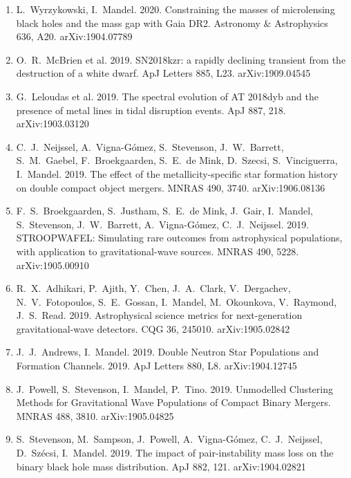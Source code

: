 \documentclass[margin,line]{res}
\begin{document}
\begin{resume}
\begin{enumerate}
\item L.~Wyrzykowski, I.~Mandel.  2020.  Constraining the masses of microlensing black holes and the mass gap with Gaia DR2.  Astronomy \& Astrophysics 636, A20.  arXiv:1904.07789

\item O.~R.~McBrien et al. 2019. SN2018kzr: a rapidly declining transient from the destruction of a white dwarf. ApJ Letters 885, L23.  arXiv:1909.04545

\item G.~Leloudas et al.  2019. The spectral evolution of AT 2018dyb and the presence of metal lines in tidal disruption events.  ApJ 887, 218.  arXiv:1903.03120

\item C.~J.~Neijssel, A.~Vigna-G\'{o}mez, S.~Stevenson, J.~W.~Barrett, S.~M.~Gaebel, F.~Broekgaarden, S.~E.~de Mink, D.~Szecsi, S.~Vinciguerra, I.~Mandel.  2019. The effect of the metallicity-specific star formation history on double compact object mergers.  MNRAS 490, 3740.  arXiv:1906.08136

\item F.~S.~Broekgaarden, S.~Justham, S.~E.~de Mink, J.~Gair, I.~Mandel, S.~Stevenson, J.~W.~Barrett, A.~Vigna-G\'{o}mez, C.~J.~Neijssel.  2019. STROOPWAFEL: Simulating rare outcomes from astrophysical populations, with application to gravitational-wave sources.  MNRAS 490, 5228.  arXiv:1905.00910

\item R.~X.~Adhikari, P.~Ajith, Y.~Chen, J.~A.~Clark, V.~Dergachev, N.~V.~Fotopoulos, S.~E.~Gossan, I.~Mandel, M.~Okounkova, V.~Raymond, J.~S.~Read.  2019. Astrophysical science metrics for next-generation gravitational-wave detectors.  CQG 36, 245010.  arXiv:1905.02842

\item J.~J.~Andrews, I.~Mandel. 2019. Double Neutron Star Populations and Formation Channels.   2019.  ApJ Letters 880, L8.  arXiv:1904.12745

\item J.~Powell, S.~Stevenson, I.~Mandel, P.~Tino.  2019.  Unmodelled Clustering Methods for Gravitational Wave Populations of Compact Binary Mergers.  MNRAS 488, 3810. arXiv:1905.04825

\item S.~Stevenson, M.~Sampson, J.~Powell, A.~Vigna-G\'{o}mez, C.~J.~Neijssel, D.~Sz\'{e}csi, I.~Mandel.  2019. The impact of pair-instability mass loss on the binary black hole mass distribution.   ApJ 882, 121.  arXiv:1904.02821 


\end{enumerate}
\end{resume}
\end{document}
